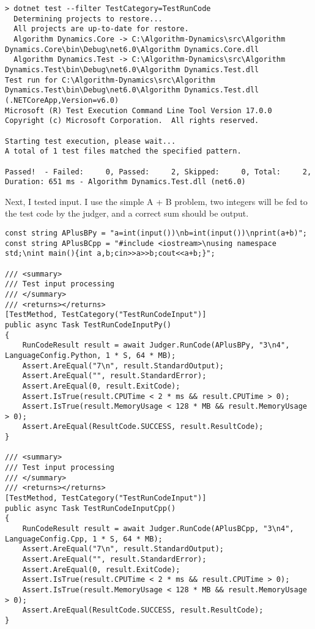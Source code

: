 \documentclass[report.tex]{subfiles}
\begin{document}
\begin{verbatim}
> dotnet test --filter TestCategory=TestRunCode
  Determining projects to restore...
  All projects are up-to-date for restore.
  Algorithm Dynamics.Core -> C:\Algorithm-Dynamics\src\Algorithm Dynamics.Core\bin\Debug\net6.0\Algorithm Dynamics.Core.dll
  Algorithm Dynamics.Test -> C:\Algorithm-Dynamics\src\Algorithm Dynamics.Test\bin\Debug\net6.0\Algorithm Dynamics.Test.dll
Test run for C:\Algorithm-Dynamics\src\Algorithm Dynamics.Test\bin\Debug\net6.0\Algorithm Dynamics.Test.dll (.NETCoreApp,Version=v6.0)
Microsoft (R) Test Execution Command Line Tool Version 17.0.0
Copyright (c) Microsoft Corporation.  All rights reserved.

Starting test execution, please wait...
A total of 1 test files matched the specified pattern.

Passed!  - Failed:     0, Passed:     2, Skipped:     0, Total:     2, Duration: 651 ms - Algorithm Dynamics.Test.dll (net6.0)
\end{verbatim}

Next, I tested input. I use the simple A + B problem, two integers will be fed to the test code by the judger, and a correct sum should be output.

\begin{verbatim}
const string APlusBPy = "a=int(input())\nb=int(input())\nprint(a+b)";
const string APlusBCpp = "#include <iostream>\nusing namespace std;\nint main(){int a,b;cin>>a>>b;cout<<a+b;}";

/// <summary>
/// Test input processing
/// </summary>
/// <returns></returns>
[TestMethod, TestCategory("TestRunCodeInput")]
public async Task TestRunCodeInputPy()
{
    RunCodeResult result = await Judger.RunCode(APlusBPy, "3\n4", LanguageConfig.Python, 1 * S, 64 * MB);
    Assert.AreEqual("7\n", result.StandardOutput);
    Assert.AreEqual("", result.StandardError);
    Assert.AreEqual(0, result.ExitCode);
    Assert.IsTrue(result.CPUTime < 2 * ms && result.CPUTime > 0);
    Assert.IsTrue(result.MemoryUsage < 128 * MB && result.MemoryUsage > 0);
    Assert.AreEqual(ResultCode.SUCCESS, result.ResultCode);
}

/// <summary>
/// Test input processing
/// </summary>
/// <returns></returns>
[TestMethod, TestCategory("TestRunCodeInput")]
public async Task TestRunCodeInputCpp()
{
    RunCodeResult result = await Judger.RunCode(APlusBCpp, "3\n4", LanguageConfig.Cpp, 1 * S, 64 * MB);
    Assert.AreEqual("7\n", result.StandardOutput);
    Assert.AreEqual("", result.StandardError);
    Assert.AreEqual(0, result.ExitCode);
    Assert.IsTrue(result.CPUTime < 2 * ms && result.CPUTime > 0);
    Assert.IsTrue(result.MemoryUsage < 128 * MB && result.MemoryUsage > 0);
    Assert.AreEqual(ResultCode.SUCCESS, result.ResultCode);
}
\end{verbatim}
\end{document}
